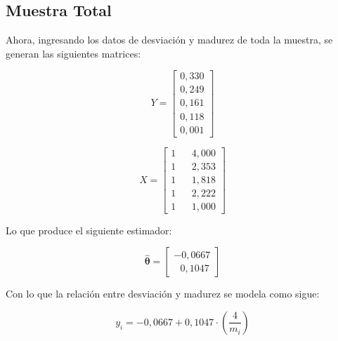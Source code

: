 \subsection{Muestra Total}

Ahora, ingresando los datos de desviación y madurez de toda la muestra, se generan las siguientes matrices:

\begin{minipage}{.45\linewidth}
    \begin{equation*}
    Y = 
        \begin{bmatrix}
            0,330 \\
            0,249 \\
            0,161 \\
            0,118 \\
            0,001 
        \end{bmatrix}
    \end{equation*}
\end{minipage}
\begin{minipage}{.45\linewidth}
    \begin{equation*}
    X = 
        \begin{bmatrix}
            1 & & 4,000 \\
            1 & & 2,353 \\
            1 & & 1,818 \\
            1 & & 2,222 \\
            1 & & 1,000
        \end{bmatrix}
    \end{equation*}
\end{minipage}

Lo que produce el siguiente estimador:

\begin{equation}
    \hat{\bm{\theta}} = 
        \begin{bmatrix}
            -0,0667 \\
            ~~~0,1047
        \end{bmatrix}
\end{equation}

Con lo que la relación entre desviación y madurez se modela como sigue:

\begin{equation}
    \label{eq.modelo-prop-todos}
    y_i = -0,0667 + 0,1047\cdot \left( \frac{4}{m_i} \right)
\end{equation}

